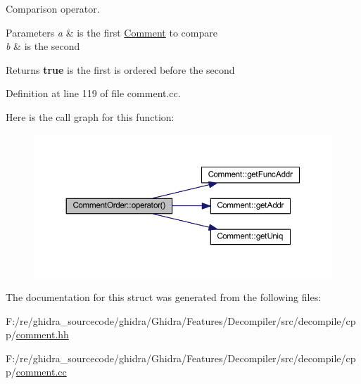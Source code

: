 Comparison operator. 


\begin{DoxyParams}{Parameters}
{\em a} & is the first \mbox{\hyperlink{class_comment}{Comment}} to compare \\
\hline
{\em b} & is the second \\
\hline
\end{DoxyParams}
\begin{DoxyReturn}{Returns}
{\bfseries{true}} is the first is ordered before the second 
\end{DoxyReturn}


Definition at line 119 of file comment.\+cc.

Here is the call graph for this function\+:
\nopagebreak
\begin{figure}[H]
\begin{center}
\leavevmode
\includegraphics[width=350pt]{struct_comment_order_abc25c16ce85b2992b4218788df3732f7_cgraph}
\end{center}
\end{figure}


The documentation for this struct was generated from the following files\+:\begin{DoxyCompactItemize}
\item 
F\+:/re/ghidra\+\_\+sourcecode/ghidra/\+Ghidra/\+Features/\+Decompiler/src/decompile/cpp/\mbox{\hyperlink{comment_8hh}{comment.\+hh}}\item 
F\+:/re/ghidra\+\_\+sourcecode/ghidra/\+Ghidra/\+Features/\+Decompiler/src/decompile/cpp/\mbox{\hyperlink{comment_8cc}{comment.\+cc}}\end{DoxyCompactItemize}
